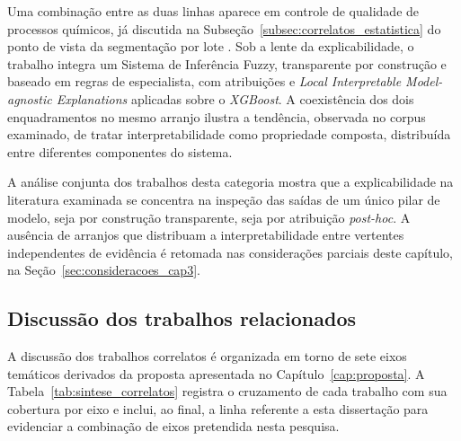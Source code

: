 Uma combinação entre as duas linhas aparece em controle de qualidade de processos químicos, já discutida na Subseção~\ref{subsec:correlatos_estatistica} do ponto de vista da segmentação por lote \cite{marindiaz2025fuzzy}. Sob a lente da explicabilidade, o trabalho integra um Sistema de Inferência Fuzzy, transparente por construção e baseado em regras de especialista, com atribuições  e \emph{Local Interpretable Model-agnostic Explanations} aplicadas sobre o \emph{XGBoost}. A coexistência dos dois enquadramentos no mesmo arranjo ilustra a tendência, observada no corpus examinado, de tratar interpretabilidade como propriedade composta, distribuída entre diferentes componentes do sistema.

A análise conjunta dos trabalhos desta categoria mostra que a explicabilidade na literatura examinada se concentra na inspeção das saídas de um único pilar de modelo, seja por construção transparente, seja por atribuição \emph{post-hoc}. A ausência de arranjos que distribuam a interpretabilidade entre vertentes independentes de evidência é retomada nas considerações parciais deste capítulo, na Seção~\ref{sec:consideracoes_cap3}.


\subsection{Discussão dos trabalhos relacionados}
\label{subsec:sintese_lacunas}

A discussão dos trabalhos correlatos é organizada em torno de sete eixos temáticos derivados da proposta apresentada no Capítulo~\ref{cap:proposta}. A Tabela~\ref{tab:sintese_correlatos} registra o cruzamento de cada trabalho com sua cobertura por eixo e inclui, ao final, a linha referente a esta dissertação para evidenciar a combinação de eixos pretendida nesta pesquisa.

